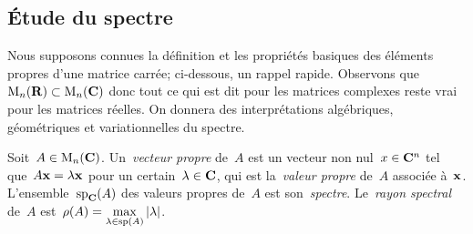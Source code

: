 %

\subsection{Étude du spectre}

Nous supposons connues la définition et les propriétés basiques des éléments
propres d'une matrice carrée; ci-dessous, un rappel rapide.  Observons
que~$\mathrm{M}_n(\mathbf{R})\subset \mathrm{M}_n(\mathbf{C})$ donc tout ce qui est dit pour les matrices
complexes reste vrai pour les matrices réelles.
On donnera des interprétations algébriques, géométriques et variationnelles
du spectre.

\begin{definition}
	Soit~$A\in\mathrm{M}_n(\mathbf{C})$.  Un~\emph{vecteur propre} de~$A$ est un vecteur non
	nul~$x\in\mathbf{C}^n$ tel que~$A\mathbf{x}=\lambda\mathbf{x}$ pour un certain~$\lambda\in\mathbf{C}$, qui
	est la~\emph{valeur propre} de~$A$ associée à~$\mathbf{x}$.
	L'ensemble~$\mathrm{sp}_{\mathbf{C}}(A)$ des valeurs propres de~$A$ est
	son~\emph{spectre}.  Le~\emph{rayon spectral} de~$A$
	est~$\displaystyle\rho(A)=\max_{\lambda\in\mathrm{sp}(A)}\left|\lambda\right|$.
\end{definition}

